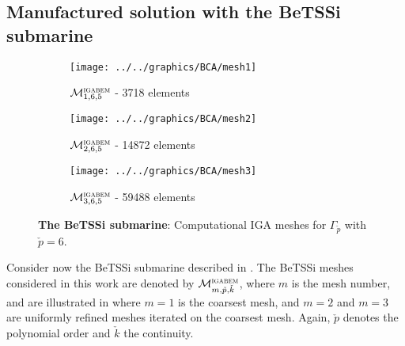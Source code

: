 \subsection{Manufactured solution with the BeTSSi submarine}
\label{Subsec3:manufactured}
\begin{figure}
	\centering
	\begin{subfigure}[t]{\textwidth}
		\texttt{[image: ../../graphics/BCA/mesh1]}
		\caption{${\cal M}_{1,6,5}^{\textsc{igabem}}$ - 3718 elements}
	\end{subfigure} 
	\par\bigskip
	\par\bigskip
	\begin{subfigure}[t]{\textwidth}
		\texttt{[image: ../../graphics/BCA/mesh2]}
		\caption{${\cal M}_{2,6,5}^{\textsc{igabem}}$ - 14872 elements}
	\end{subfigure} 
	\par\bigskip
	\par\bigskip
	\begin{subfigure}[t]{\textwidth}
		\texttt{[image: ../../graphics/BCA/mesh3]}
		\caption{${\cal M}_{3,6,5}^{\textsc{igabem}}$ - 59488 elements}
	\end{subfigure} 
	\caption{\textbf{The BeTSSi submarine}: Computational IGA meshes for $\Gamma_{\check{p}}$ with $\check{p}=6$.}
	\label{Fig3:BeTSSimeshes}
\end{figure}
Consider now the BeTSSi submarine described in . The BeTSSi meshes considered in this work are denoted by ${\cal M}_{m,\check{p},\check{k}}^{\textsc{igabem}}$, where $m$ is the mesh number, and are illustrated in  where $m=1$ is the coarsest mesh, and $m=2$ and $m=3$ are uniformly refined meshes iterated on the coarsest mesh. Again, $\check{p}$ denotes the polynomial order and $\check{k}$ the continuity.

